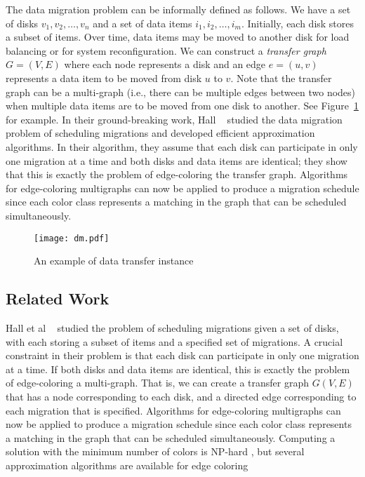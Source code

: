 \documentclass[titlepage, 11pt]{article}
\begin{document}
The data migration problem can be informally defined as follows.
We have a set of disks $v_1, v_2, \dots, v_n$ and
a set of data items $i_1, i_2, \dots, i_m$. Initially,
each disk stores a subset of items. Over time, data items
may be moved to another disk for load balancing or for system reconfiguration.
We can construct a \emph{transfer graph} $G = (V, E)$ where 
each node represents a disk and an edge $e= (u, v)$ represents a data item
to be moved from disk $u$ to $v$. 
Note that the transfer graph can be a multi-graph (i.e., there
can be multiple edges between two nodes) when multiple data
items are to be moved from one disk to another.
See Figure~\ref{fig:dm-example} for example.
In their ground-breaking work, Hall ~\cite{Karlin} studied
the data migration problem of scheduling migrations 
and developed efficient approximation algorithms.
In their algorithm, they assume that each disk can participate
in only one migration at a time and  both disks and data items are identical;
they show that this is exactly the problem of edge-coloring the transfer graph. 
Algorithms for edge-coloring multigraphs can now be applied to produce 
a migration schedule since each color class represents a matching 
in the graph that can be scheduled simultaneously.
\begin{figure}[h]
\centering
\texttt{[image: dm.pdf]}
\vspace{0.2in}
\caption{
An example of data transfer instance}
\label{fig:dm-example}
\end{figure}

\subsection{Related Work}
Hall et al ~\cite{Karlin} studied
the problem of scheduling migrations given a set of disks, with each storing a subset of items
and a specified set of migrations. A crucial constraint in their problem is that each disk can participate
in only one migration at a time. If both disks and data items are identical,
this is exactly the problem of edge-coloring a multi-graph.
That is, we can create a transfer graph $G(V, E)$ that has a node corresponding to each disk, and
a directed edge corresponding to each migration that is specified.
Algorithms for edge-coloring multigraphs can now be applied to produce
a migration schedule since each color class represents a matching
in the graph that can be scheduled simultaneously.
Computing a solution with the minimum number of
colors is \textsf{NP}-hard \cite{holyerNPhard}, but several approximation algorithms
are available for edge coloring
\end{document}
